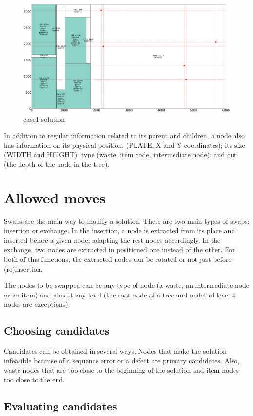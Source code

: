 \documentclass{roadef}
\begin{document}
        \begin{figure}
            \centering
            \includegraphics[width=0.4\linewidth]{case1_heur.png}
            \caption{case1 solution} \label{fig:case1}
        \end{figure}

        In addition to regular information related to its parent and children, a node also has information on its physical position: (PLATE, X and Y coordinates); its size (WIDTH and HEIGHT); type (waste, item code, intermediate node); and cut (the depth of the node in the tree).

\section{Allowed moves}

    Swaps are the main way to modify a solution. There are two main types of swaps: insertion or exchange. In the insertion, a node is extracted from its place and inserted before a given node, adapting the rest nodes accordingly. In the exchange, two nodes are extracted in positioned one instead of the other. For both of this functions, the extracted nodes can be rotated or not just before (re)insertion.

    The nodes to be swapped can be any type of node (a waste, an intermediate node or an item) and almost any level (the root node of a tree and nodes of level 4 nodes are exceptions).

    \subsection{Choosing candidates}

        Candidates can be obtained in several ways. Nodes that make the solution infeasible because of a sequence error or a defect are primary candidates. Also, waste nodes that are too close to the beginning of the solution and item nodes too close to the end.

    \subsection{Evaluating candidates}
\end{document}
